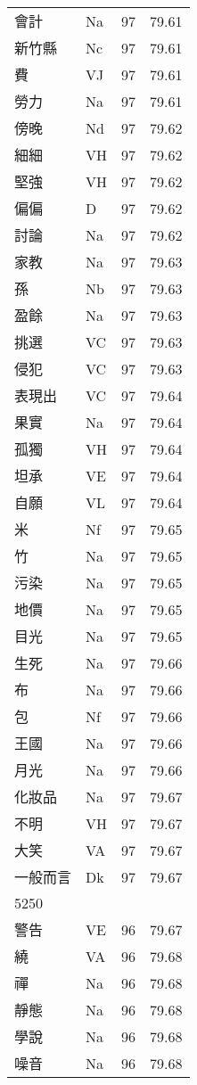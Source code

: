\documentclass[twocolumn]{book}
\begin{document}
\begin{supertabular}{llrr}
會計 & Na & 97 &  79.61\\
新竹縣 & Nc & 97 &  79.61\\
費 & VJ & 97 &  79.61\\
勞力 & Na & 97 &  79.61\\
傍晚 & Nd & 97 &  79.62\\
細細 & VH & 97 &  79.62\\
堅強 & VH & 97 &  79.62\\
偏偏 & D & 97 &  79.62\\
討論 & Na & 97 &  79.62\\
家教 & Na & 97 &  79.63\\
孫 & Nb & 97 &  79.63\\
盈餘 & Na & 97 &  79.63\\
挑選 & VC & 97 &  79.63\\
侵犯 & VC & 97 &  79.63\\
表現出 & VC & 97 &  79.64\\
果實 & Na & 97 &  79.64\\
孤獨 & VH & 97 &  79.64\\
坦承 & VE & 97 &  79.64\\
自願 & VL & 97 &  79.64\\
米 & Nf & 97 &  79.65\\
竹 & Na & 97 &  79.65\\
污染 & Na & 97 &  79.65\\
地價 & Na & 97 &  79.65\\
目光 & Na & 97 &  79.65\\
生死 & Na & 97 &  79.66\\
布 & Na & 97 &  79.66\\
包 & Nf & 97 &  79.66\\
王國 & Na & 97 &  79.66\\
月光 & Na & 97 &  79.66\\
化妝品 & Na & 97 &  79.67\\
不明 & VH & 97 &  79.67\\
大笑 & VA & 97 &  79.67\\
一般而言 & Dk & 97 &  79.67\\
5250\\
警告 & VE & 96 &  79.67\\
繞 & VA & 96 &  79.68\\
禪 & Na & 96 &  79.68\\
靜態 & Na & 96 &  79.68\\
學說 & Na & 96 &  79.68\\
噪音 & Na & 96 &  79.68\\

\end{supertabular}
\end{document}
